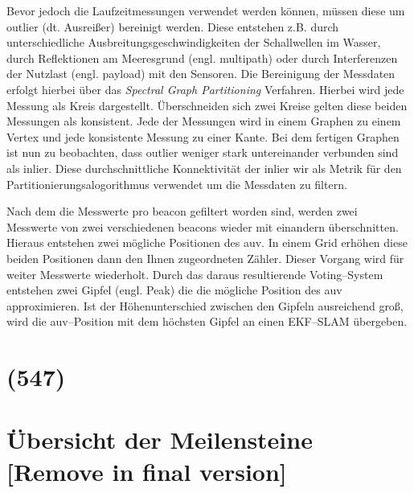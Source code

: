Bevor jedoch die Laufzeitmessungen verwendet werden können, müssen diese um \Gls{outlier} (dt. Ausreißer) bereinigt werden. Diese entstehen z.B. durch unterschiedliche Ausbreitungsgeschwindigkeiten der Schallwellen im Wasser, durch Reflektionen am Meeresgrund (engl. \Gls{multipath}) oder durch Interferenzen der Nutzlast (engl. \Gls{payload}) mit den Sensoren. Die Bereinigung der Messdaten erfolgt hierbei über das \textit{Spectral Graph Partitioning} Verfahren. Hierbei wird jede Messung als Kreis dargestellt. Überschneiden sich zwei Kreise gelten diese beiden Messungen als konsistent. Jede der Messungen wird in einem Graphen zu einem Vertex und jede konsistente Messung zu einer Kante. Bei dem fertigen Graphen ist nun zu beobachten, dass \Gls{outlier} weniger stark untereinander verbunden sind als \Gls{inlier}. Diese durchschnittliche Konnektivität der \Gls{inlier} wir als Metrik für den Partitionierungsalogorithmus verwendet um die Messdaten zu filtern.

Nach dem die Messwerte pro \Gls{beacon} gefiltert worden sind, werden zwei Messwerte von zwei verschiedenen \Glspl{beacon} wieder mit einandern überschnitten. Hieraus entstehen zwei mögliche Positionen des \gls{auv}. In einem Grid erhöhen diese beiden Positionen dann den Ihnen zugeordneten Zähler. Dieser Vorgang wird für weiter Messwerte wiederholt. Durch das daraus resultierende Voting--System entstehen zwei Gipfel (engl. Peak) die die mögliche Position des \gls{auv} approximieren. Ist der Höhenunterschied zwischen den Gipfeln ausreichend groß, wird die \gls{auv}--Position mit dem höchsten Gipfel an einen EKF--SLAM übergeben.


\begin{comment}
------------------------------------------------------------------------------------------
\end{comment}
\section{(547)}



\begin{comment}
------------------------------------------------------------------------------------------
\end{comment}
\section{Übersicht der Meilensteine [Remove in final version]}

